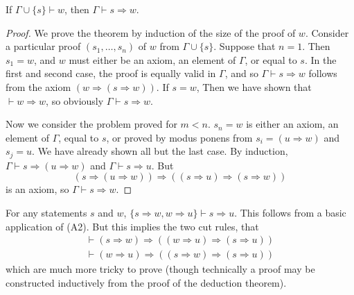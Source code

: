 \begin{theorem}
    If $\Gamma \cup \{ s \} \vdash w$, then $\Gamma \vdash s \Rightarrow w$.
\end{theorem}
\begin{proof}
    We prove the theorem by induction of the size of the proof of $w$. Consider a particular proof $(s_1, \dots, s_n)$ of $w$ from $\Gamma \cup \{ s \}$. Suppose that $n = 1$. Then $s_1 = w$, and $w$ must either be an axiom, an element of $\Gamma$, or equal to $s$. In the first and second case, the proof is equally valid in $\Gamma$, and so $\Gamma \vdash s \Rightarrow w$ follows from the axiom $(w \Rightarrow (s \Rightarrow w))$. If $s = w$, Then we have shown that $\vdash w \Rightarrow w$, so obviously $\Gamma \vdash s \Rightarrow w$.

    Now we consider the problem proved for $m < n$. $s_n = w$ is either an axiom, an element of $\Gamma$, equal to $s$, or proved by modus ponens from $s_i = (u \Rightarrow w)$ and $s_j = u$. We have already shown all but the last case. By induction, $\Gamma \vdash s \Rightarrow (u \Rightarrow w)$ and $\Gamma \vdash s \Rightarrow u$. But
    \[ (s \Rightarrow (u \Rightarrow w)) \Rightarrow ((s \Rightarrow u) \Rightarrow (s \Rightarrow w)) \]
    is an axiom, so $\Gamma \vdash s \Rightarrow w$.
\end{proof}

\begin{example}
    For any statements $s$ and $w$, $\{ s \Rightarrow w, w \Rightarrow u \} \vdash s \Rightarrow u$. This follows from a basic application of (A2). But this implies the two cut rules, that
    \begin{gather*}
        \vdash (s \Rightarrow w) \Rightarrow ((w \Rightarrow u) \Rightarrow (s \Rightarrow u))\\
        \vdash (w \Rightarrow u) \Rightarrow ((s \Rightarrow w) \Rightarrow (s \Rightarrow u))
    \end{gather*}
    which are much more tricky to prove (though technically a proof may be constructed inductively from the proof of the deduction theorem).
\end{example}

